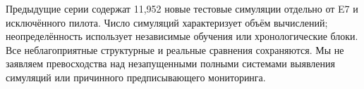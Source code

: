 \documentclass[runningheads]{llncs}
\begin{document}
Предыдущие серии содержат 11,952 новые тестовые симуляции отдельно от E7 и исключённого пилота. Число симуляций характеризует объём вычислений; неопределённость использует независимые обучения или хронологические блоки. Все неблагоприятные структурные и реальные сравнения сохраняются. Мы не заявляем превосходства над незапущенными полными системами выявления симуляций или причинного предписывающего мониторинга.





\label{maintextend}


\end{document}
